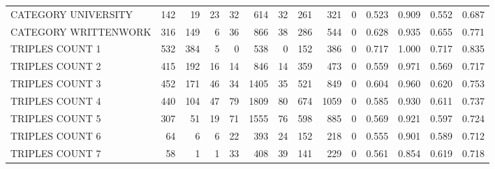 \begin{tabular}{lrrrrrrrrrllll}
 CATEGORY UNIVERSITY      &             142 &            19 &              23 &              32 &             614 &   32 &  261 &  321 &    0 & 0.523 & 0.909 & 0.552 & 0.687 \\
 CATEGORY WRITTENWORK     &             316 &           149 &               6 &              36 &             866 &   38 &  286 &  544 &    0 & 0.628 & 0.935 & 0.655 & 0.771 \\
 TRIPLES COUNT 1          &             532 &           384 &               5 &               0 &             538 &    0 &  152 &  386 &    0 & 0.717 & 1.000 & 0.717 & 0.835 \\
 TRIPLES COUNT 2          &             415 &           192 &              16 &              14 &             846 &   14 &  359 &  473 &    0 & 0.559 & 0.971 & 0.569 & 0.717 \\
 TRIPLES COUNT 3          &             452 &           171 &              46 &              34 &            1405 &   35 &  521 &  849 &    0 & 0.604 & 0.960 & 0.620 & 0.753 \\
 TRIPLES COUNT 4          &             440 &           104 &              47 &              79 &            1809 &   80 &  674 & 1059 &    0 & 0.585 & 0.930 & 0.611 & 0.737 \\
 TRIPLES COUNT 5          &             307 &            51 &              19 &              71 &            1555 &   76 &  598 &  885 &    0 & 0.569 & 0.921 & 0.597 & 0.724 \\
 TRIPLES COUNT 6          &              64 &             6 &               6 &              22 &             393 &   24 &  152 &  218 &    0 & 0.555 & 0.901 & 0.589 & 0.712 \\
 TRIPLES COUNT 7          &              58 &             1 &               1 &              33 &             408 &   39 &  141 &  229 &    0 & 0.561 & 0.854 & 0.619 & 0.718 \\
\hline
\end{tabular}